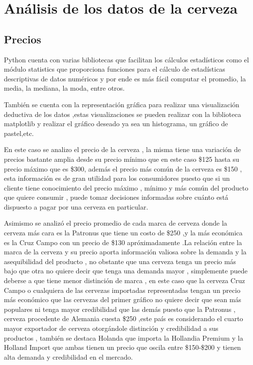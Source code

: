 \documentclass[twocolumn,12pt]{article}
\begin{document}
\section{Análisis de los datos de la cerveza}

\subsection{Precios}

Python cuenta con varias bibliotecas que facilitan los cálculos estadísticos como el módulo statistics que proporciona funciones para el cálculo de estadísticas descriptivas de datos numéricos y por ende es más fácil computar el promedio, la media, la mediana, la moda, entre otros.

También se cuenta con la representación gráfica para realizar una  visualización deductiva de los datos ,estas visualizaciones se pueden realizar con la biblioteca matplotlib y realizar el gráfico deseado ya sea un histograma, un gráfico de pastel,etc.

En este caso se analizo el precio de la cerveza , la misma tiene una variación de precios bastante amplia desde su precio mínimo que en este caso \$125 hasta su precio máximo que es \$300, además el precio más común de la cerveza es \$150 , esta información es de gran utilidad para los consumidores puesto que si un cliente tiene conocimiento del precio máximo , mínimo y más común del producto que quiere consumir , puede tomar decisiones informadas sobre cuánto está dispuesto a pagar por una cerveza en particular.

Asimismo se analizó el precio promedio de cada marca de cerveza donde la cerveza más cara es la Patronus que tiene un costo de \$250 ,y la más económica es la Cruz Campo con un precio de \$130 apróximadamente .La relación entre la marca de la cerveza y su precio aporta información valiosa sobre la demanda y la asequibilidad del producto , no obstante que una cerveza tenga un precio más bajo que otra no quiere decir que tenga una demanda mayor , simplemente puede deberse a que tiene menor distinción de marca , en este caso que la cerveza Cruz Campo o cualquiera de las cervezas importadas representadas  tengan un precio más económico que las cervezas del primer gráfico no quiere decir que sean más populares ni tenga mayor credibilidad que las demás puesto que la Patronus , cerveza procedente de Alemania cuesta \$250 ,este país es considerando el cuarto mayor exportador de cerveza otorgándole distinción y credibilidad a sus productos , también se destaca Holanda que importa la Hollandia Premium y la Holland Import que ambas tienen un precio que oscila entre \$150-\$200 y tienen alta demanda y credibilidad en el mercado.
\end{document}
